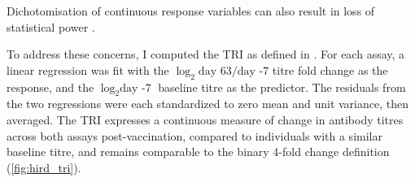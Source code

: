 Dichotomisation of continuous response variables can also result in loss of statistical power \autocite{cohen1983CostDichotomization, fedorov2009ConsequencesDichotomization}.

To address these concerns, I computed the \gls{TRI} as defined in \textcite{bucasas2011EarlyPatternsGene}.
For each assay, a linear regression was fit with the $\log_2{\text{day 63}/\text{day -7}}$ titre fold change as the response, and the $\log_2{\text{day -7}}$ baseline titre as the predictor.
The residuals from the two regressions were each standardized to zero mean and unit variance, then averaged.
The \gls{TRI} expresses a continuous measure of change in antibody titres across both assays post-vaccination, compared to individuals with a similar baseline titre, and remains comparable to the binary 4-fold change definition (\cref{fig:hird_tri}).

